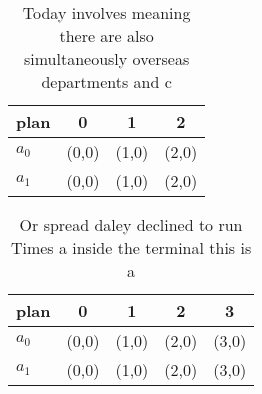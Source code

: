 \documentclass[a4paper]{article}
\begin{document}
\begin{table}
\begin{adjustbox}{width=0.7\columnwidth}
\begin{tabular}{|l|l|l|l|}
\hline
\textbf{plan} & \multicolumn{1}{c|}{\textbf{0}} & \multicolumn{1}{c|}{\textbf{1}} & \multicolumn{1}{c|}{\textbf{2}} \\ \hline
\textbf{$a_0$}  & (0,0) & (1,0) & (2,0) \\ \hline
\textbf{$a_1$}  & (0,0) & (1,0) & (2,0) \\ \hline
\end{tabular}
\end{adjustbox}
\caption{Today involves meaning there are also simultaneously overseas departments and c
}
\end{table}

\begin{table}
\begin{adjustbox}{width=0.9\columnwidth}
\begin{tabular}{|l|l|l|l|l|}
\hline
\textbf{plan} & \multicolumn{1}{c|}{\textbf{0}} & \multicolumn{1}{c|}{\textbf{1}} & \multicolumn{1}{c|}{\textbf{2}} & \multicolumn{1}{c|}{\textbf{3}} \\ \hline
\textbf{$a_0$}  & (0,0) & (1,0) & (2,0) & (3,0) \\ \hline
\textbf{$a_1$}  & (0,0) & (1,0) & (2,0) & (3,0) \\ \hline
\end{tabular}
\end{adjustbox}
\caption{Or spread daley declined to run Times a inside the terminal this is a
}
\end{table}
\end{document}
